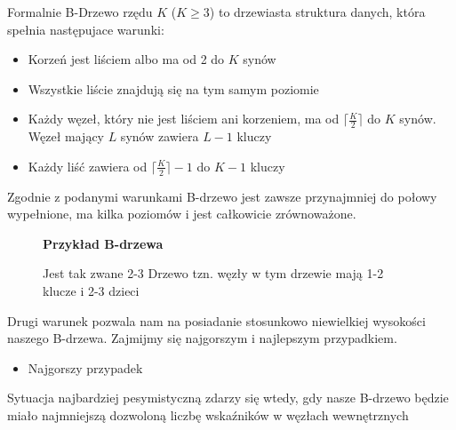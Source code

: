 \begin{definition}
Formalnie B-Drzewo rzędu $K$ ($K \geq 3$) to drzewiasta struktura danych, która spełnia następujace warunki:
\begin{itemize}
\item Korzeń jest liściem albo ma od 2 do $K$ synów
\item Wszystkie liście znajdują się na tym samym poziomie 
\item Każdy węzeł, który nie jest liściem ani korzeniem, ma od $\lceil\frac{K}{2}\rceil$ do $K$ synów.
Węzeł mający $L$ synów zawiera $L-1$ kluczy
\item Każdy liść zawiera od $\lceil\frac{K}{2}\rceil - 1$ do $K-1$ kluczy
\end{itemize}
\end{definition}
Zgodnie z podanymi warunkami B-drzewo jest zawsze przynajmniej do połowy wypełnione, ma kilka poziomów i jest całkowicie zrównoważone.
\begin{figure}[!h]
\centering
\textbf{Przykład B-drzewa}\par
\medskip
{}
\bigskip
\captionsetup{justification=centering}
\caption{Jest tak zwane 2-3 Drzewo tzn. węzły w tym drzewie mają 1-2 klucze i 2-3 dzieci}
\end{figure}
\newpage
Drugi warunek pozwala nam na posiadanie stosunkowo niewielkiej wysokości naszego B-drzewa.
Zajmijmy się najgorszym i najlepszym przypadkiem.
\begin{itemize}
\item Najgorszy przypadek
\end{itemize}
Sytuacja najbardziej pesymistyczną zdarzy się wtedy, gdy nasze B-drzewo będzie miało najmniejszą dozwoloną liczbę wskaźników w węzłach wewnętrznych

